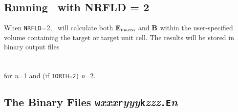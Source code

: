 \subsection{Running \ddscatseventhree\ with NRFLD = 2}

When {\tt NRFLD}=2, \ddscatseventhree\ will calculate both ${\bf E}_{\rm macro}$
and ${\bf B}$
within the user-specified volume containing the
target or target unit cell.
The results will be stored in binary output files\\
\indent{}\\
\indent{}\\
for {\it n}=1 and (if {\tt IORTH=2}) {\it n}=2.

\subsection{The Binary Files {\tt w}{\it xxx}{\tt r}{\it yyy}{\tt k}{\it zzz}{\tt .E}{\it n}}

